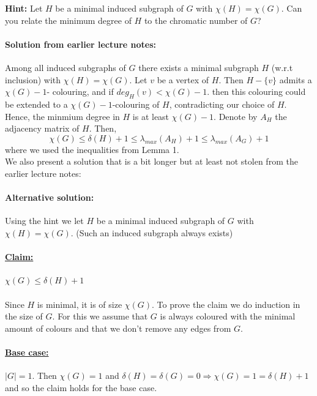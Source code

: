 \documentclass{article}
\begin{document}
\textbf{Hint:} Let $H$ be a minimal induced subgraph of $G$ with $\chi(H) = \chi(G)$. Can you relate the minimum degree of $H$ to the chromatic number of $G$?
  
\paragraph{Solution from earlier lecture notes:} Among all induced subgraphs of $G$ there exists a minimal subgraph $H$ (w.r.t inclusion) with $\chi(H)= \chi(G)$. Let $v$ be a vertex of $H$. Then $H - \{v\}$ admits a $\chi(G) - 1$- colouring, and if $deg_{H}(v) < \chi(G) - 1$. then this colouring could be extended to a $\chi(G) - 1$-colouring of $H$, contradicting our choice of $H$. Hence, the minmium degree in $H$ is at least $\chi(G) - 1$. Denote by $A_{H}$ the adjacency matrix of $H$. Then, 
$$\chi(G) \leq \delta(H) + 1 \leq \lambda_{max}(A_{H}) + 1\leq \lambda_{max}(A_{G}) + 1$$ where we used the inequalities from Lemma 1.\\

We also present a solution that is a bit longer but at least not stolen from the earlier lecture notes:

\paragraph{Alternative solution:} Using the hint we let $H$ be a minimal induced subgraph of $G$ with $\chi(H) = \chi(G)$. (Such an induced subgraph always exists) 

\paragraph{\underline{Claim:}} $\chi(G) \leq \delta(H) + 1 $ 

\paragraph{} Since $H$ is minimal, it is of size $\chi(G)$. To prove the claim we do induction in the size of $G$. For this we assume that $G$ is always coloured with the minimal amount of colours and that we don't remove any edges from $G$. 

\paragraph{\underline{Base case:}} 
$|G|=1$. Then $\chi(G) = 1$ and $\delta(H) = \delta(G) = 0  \Rightarrow \chi(G) = 1 = \delta(H) + 1$ and so the claim holds for the base case.
\end{document}
